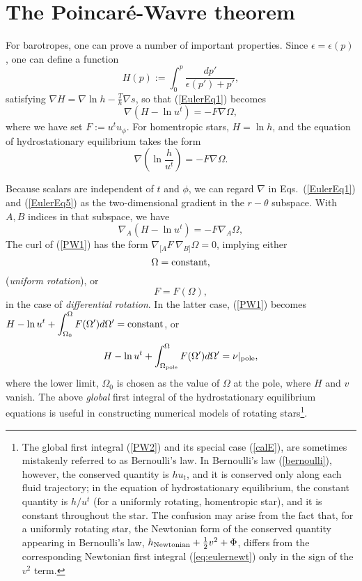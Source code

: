 \documentclass[12pt]{article}
\def\be{\begin{equation}}
\def\ee{\end{equation}}
\newcommand{\dis}{\displaystyle}
\begin{document}
\section{The Poincar\'e-Wavre theorem}
\label{sec:poincare-wavre}

For barotropes,
one can prove a number of important properties. Since 
$\epsilon=\epsilon(p)$, one can define a function
\be
H(p) := \int_0^p \frac{dp'}{\epsilon(p')+p'},
\ee
satisfying $\nabla H = \nabla \ln h - \frac{T}{h} \nabla s$, 
so that (\ref{EulerEq1}) becomes
\be
\nabla (H-\ln u^t) = -F \nabla  \Omega,
\label{PW0}
\ee
where we have set $F:=u^t u_\phi$. For homentropic stars, $H=\ln h$, and 
the equation of hydrostationary equilibrium takes the form 
\be
\nabla \left(\ln \frac h{u^t} \right) = -F \nabla  \Omega.
\label{eq:hequil}
\ee

Because scalars are independent of $t$ and $\phi$, we can regard $\nabla$ in 
Eqs.~(\ref{EulerEq1}) and (\ref{EulerEq5}) as the two-dimensional gradient in 
the $r-\theta$ subspace. With $A,B$ indices in that subspace, we have 
\be
\nabla_A (H-\ln u^t) = -F \nabla_A \Omega,
\label{PW1}
\ee
The curl of (\ref{PW1}) has the form
 $\nabla_{[A}F\ \nabla_{B]}\Omega=0$, implying either 
\be
\Omega={\rm constant},
\ee
({\it uniform rotation}), or 
\be
F=F(\Omega),
\label{Fomega}
\ee
in the case of {\it differential rotation}. In the latter case, (\ref{PW1})
becomes\\
$\dis H-\ln u^t+\int^\Omega_{\Omega_0} F(\Omega')d\Omega' ={\rm constant}$, 
or 
\be
H-\ln u^t+\int^\Omega_{\Omega_{\rm pole}} F(\Omega')d\Omega' =\nu|_{\rm pole},
\label{PW2}
\ee
where the lower limit, $\Omega_0$ is chosen as the value of $\Omega$ at the pole, 
where $H$ and $v$ vanish.  The above {\it global} first integral of the hydrostationary equilibrium 
equations is useful in constructing numerical models of rotating stars\footnote{The
global first integral (\ref{PW2}) and its special case (\ref{calE}), are 
sometimes mistakenly referred to as Bernoulli's law. In Bernoulli's law 
(\ref{bernoulli}), however, the conserved quantity is $hu_t$, and it is 
conserved only along each fluid trajectory; in the equation of hydrostationary 
equilibrium, the constant quantity is $h/u^t$ (for a uniformly rotating, homentropic star), 
and it is constant throughout the star. The confusion may arise from the 
fact that, for a uniformly rotating star, the Newtonian form of the conserved 
quantity appearing in Bernoulli's law, $h_{\rm Newtonian} +\frac12 v^2 +\Phi$, 
differs from the corresponding Newtonian first integral (\ref{eq:eulernewt}) 
only in the sign of the 
$\dis v^2$ term.}.
\end{document}
